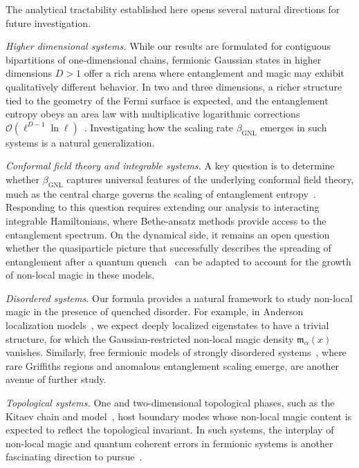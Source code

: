 \documentclass[aps,prl,twocolumn,superscriptaddress,reprint,longbibliography,nofootinbib]{revtex4-2}
\newcommand{\RENYI}{\alpha}
\begin{document}
The analytical tractability established here opens several natural directions for future investigation.

\emph{Higher dimensional systems.}
While our results are formulated for contiguous bipartitions of one-dimensional chains, fermionic Gaussian states in higher dimensions $D>1$ offer a rich arena where entanglement and magic may exhibit qualitatively different behavior. In two and three dimensions, a richer structure tied to the geometry of the Fermi surface is expected, and the entanglement entropy obeys an area law with multiplicative logarithmic corrections $\mathcal{O}(\ell^{D-1}\ln\ell)$~\cite{swingle2010entanglement}. 
Investigating how the scaling rate $\beta_\mathrm{GNL}$ emerges in such systems is a natural generalization.


\emph{Conformal field theory and integrable systems.}
A key question is to determine whether $\beta_{\mathrm{GNL}}$ captures universal features of the underlying conformal field theory, much as the central charge governs the scaling of entanglement entropy~\cite{Calabrese2004entanglement}.
Responding to this question requires extending our analysis to interacting integrable Hamiltonians, where Bethe-ansatz methods provide access to the entanglement spectrum.
On the dynamical side, it remains an open question whether the quasiparticle picture that successfully describes the spreading of entanglement after a quantum quench~\cite{Alba_2017,alba2019,Kudler_Flam_2021} can be adapted to account for the growth of non-local magic in these models.

\emph{Disordered systems.}
Our formula provides a natural framework to study non-local magic in the presence of quenched disorder. 
For example, in Anderson localization models~\cite{evers,sierant2020}, we expect deeply localized eigenstates to have a trivial structure, for which the Gaussian-restricted non-local magic density $\mathfrak{m}_\RENYI(x)$ vanishes. 
Similarly, free fermionic models of strongly disordered systems~\cite{IGLOI_2005,Monthus_2018,ruggiero2022}, where rare Griffiths regions and anomalous entanglement scaling emerge, are another avenue of further study.

\emph{Topological systems.}
One and two-dimensional topological phases, such as the Kitaev chain and model~\cite{Kitaev2001chain,Kitaev_2006}, host boundary modes whose non-local magic content is expected to reflect the topological invariant.
In such systems, the interplay of non-local magic and quantum coherent errors in fermionic systems is another fascinating direction to pursue~\cite{beri,gskb-t5ql}.
\end{document}
